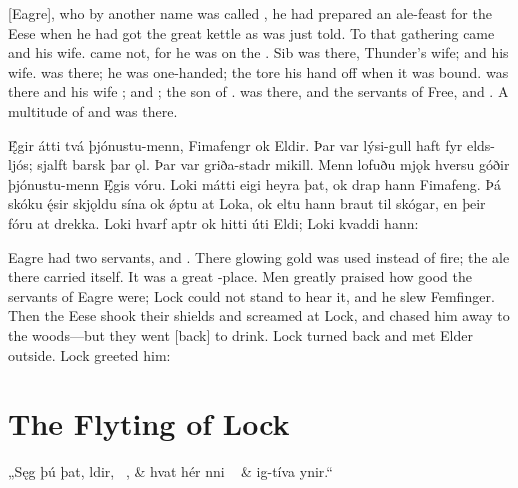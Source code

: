 \bpb {}[{\huge E}agre], who by another name was called , he had prepared an ale-feast for the Eese when he had got the great kettle as was just told. To that gathering came  and  his wife.  came not, for he was on the . Sib was there, Thunder’s wife;  and  his wife.  was there; he was one-handed; the  tore his hand off when it was bound.  was there and his wife ;  and ;  the son of .  was there, and the servants of Free,  and . A multitude of  and  was there.\epb\epg


\bpg\bpa Ę́gir átti tvá þjónustu-menn, Fimafengr ok Eldir. Þar var lýsi-gull haft fyr elds-ljós; sjalft barsk þar ǫl. Þar var griða-stadr mikill. Menn lofuðu mjǫk hversu góðir þjónustu-menn Ę́gis vóru. Loki mátti eigi heyra þat, ok drap hann Fimafeng. Þá skóku ę́sir skjǫldu sína ok ǿptu at Loka, ok eltu hann braut til skógar, en þeir fóru at drekka. Loki hvarf aptr ok hitti úti Eldi; Loki kvaddi hann:\epa

\bpb Eagre had two servants,  and . There glowing gold was used instead of fire; the ale there carried itself. It was a great -place. Men greatly praised how good the servants of Eagre were; Lock could not stand to hear it, and he slew Femfinger. Then the Eese shook their shields and screamed at Lock, and chased him away to the woods—but they went [back] to drink. Lock turned back and met Elder outside. Lock greeted him:\epb\epg

\sectionline

\section{The Flyting of Lock}

\bvg\bva%
„Sęg þú þat, ldir, \hld\ , &
hvat hér nni \hld\  &
\ind {}ig-tíva ynir.“\eva

